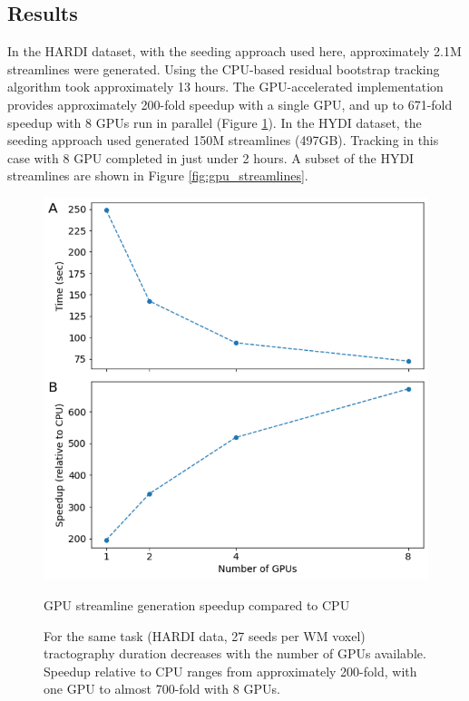 \subsection{Results} 
In the HARDI dataset, with the seeding approach used
here, approximately 2.1M streamlines were generated. Using the CPU-based
residual bootstrap tracking algorithm took approximately 13 hours. The
GPU-accelerated implementation provides approximately 200-fold speedup
with a single GPU, and up to 671-fold speedup with 8 GPUs run in
parallel (Figure \ref{fig:gpu_speedup}). In the HYDI dataset, the seeding approach used generated 150M streamlines (497GB). Tracking in this case with 8 GPU
completed in just under 2 hours. A subset of the HYDI streamlines are
shown in Figure \ref{fig:gpu_streamlines}.

\begin{figure}[htbp]
    \centering
    \includegraphics[width=\textwidth]{../figures/chapter2/speedup.png}
    \caption{GPU streamline generation speedup compared to CPU}
    \caption*{For the same task (HARDI data, 27 seeds per WM voxel) tractography duration decreases with the number of GPUs available. Speedup relative to CPU ranges from approximately 200-fold, with one GPU to almost 700-fold with 8 GPUs.}
    \label{fig:gpu_speedup}
\end{figure}

